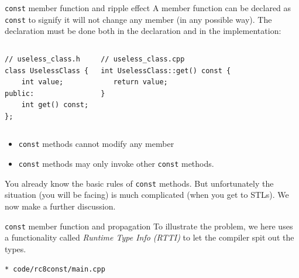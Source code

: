 \begin{frame}[fragile]{\texttt{const} member function and ripple effect}
A member function can be declared as \texttt{const} to signify it will not change any member (in any possible way). The declaration must be done both in the declaration and in the implementation:

\begin{columns}

\vspace{-.25in}
\begin{verbatim}
// useless_class.h
class UselessClass {
    int value;
public:
    int get() const;
};
\end{verbatim}


\vspace{-.25in}
\begin{verbatim}
// useless_class.cpp
int UselessClass::get() const {
   return value;
}
\end{verbatim}
\end{columns}

\begin{itemize}
	\item \texttt{const} methods cannot modify any member
	\item \texttt{const} methods may only invoke other \texttt{const} methods.
\end{itemize}
You already know the basic rules of \texttt{const} methods. But unfortunately the situation (you will be facing) is much complicated (when you get to STLs). We now make a further discussion. 
\end{frame}

\begin{frame}[fragile]{\texttt{const} member function and propagation}
To illustrate the problem, we here uses a functionality called \textit{Runtime Type Info (RTTI)} to let the compiler spit out the types.

\texttt{* code/rc8const/main.cpp}
\inputminted[fontsize=\small, baselinestretch=0.865]{c++}{code/rc8const/main.cpp}	
\end{frame}

